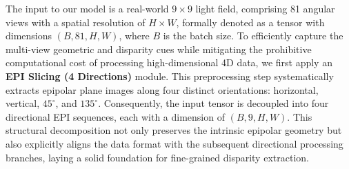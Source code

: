 \documentclass[journal]{IEEEtran}
\begin{document}
The input to our model is a real-world $9 \times 9$ light field, comprising 81 angular views with a spatial resolution of $H \times W$, formally denoted as a tensor with dimensions $(B, 81, H, W)$, where $B$ is the batch size. To efficiently capture the multi-view geometric and disparity cues while mitigating the prohibitive computational cost of processing high-dimensional 4D data, we first apply an \textbf{EPI Slicing (4 Directions)} module. This preprocessing step systematically extracts epipolar plane images along four distinct orientations: horizontal, vertical, $45^\circ$, and $135^\circ$. Consequently, the input tensor is decoupled into four directional EPI sequences, each with a dimension of $(B, 9, H, W)$. This structural decomposition not only preserves the intrinsic epipolar geometry but also explicitly aligns the data format with the subsequent directional processing branches, laying a solid foundation for fine-grained disparity extraction.
\end{document}

